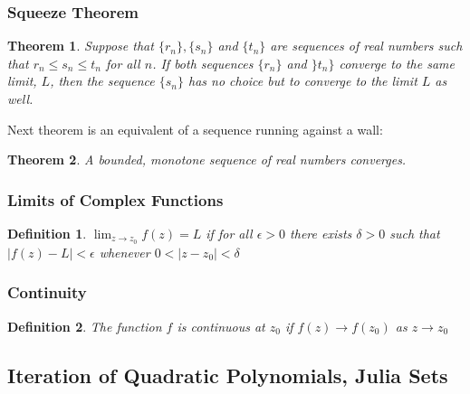 \documentclass{article}
\newtheorem{theorem}{Theorem}[section]
\newtheorem{definition}{Definition}[section]
\begin{document}
\subsubsection{Squeeze Theorem}
\begin{theorem}
Suppose that $\{r_n\},\{s_n\}$ and $\{t_n\}$ are sequences of real numbers such that $r_n \leq s_n \leq t_n$ for all $n$. If both sequences $\{r_n\}$ and $\}t_n\}$ converge to the same limit, $L$, then the sequence $\{s_n\}$ has no choice but to converge to the limit $L$ as well.
\end{theorem}
Next theorem is an equivalent of a sequence running against a wall:
\begin{theorem}
A bounded, monotone sequence of real numbers converges.
\end{theorem}

\subsubsection{Limits of Complex Functions}
\begin{definition}
$\lim_{z \to z_0} f(z) = L$ if for all $\epsilon > 0$ there exists $\delta > 0$ such that $\left|f(z) - L\right| < \epsilon$ whenever $0 < \left|z - z_0\right| < \delta$
\end{definition}

\subsubsection{Continuity}
\begin{definition}
The function $f$ is continuous at $z_0$ if $f(z) \to f(z_0)$ as $z \to z_0$
\end{definition}

\subsection{Iteration of Quadratic Polynomials, Julia Sets}
\end{document}
